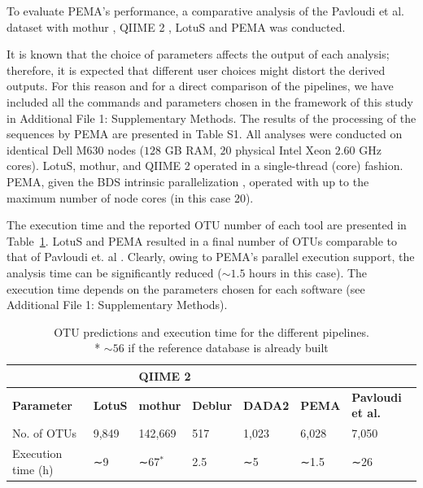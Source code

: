       To evaluate PEMA's performance, a comparative analysis of the Pavloudi et al. \cite{pavloudi2017sediment} dataset with mothur \cite{schloss2009introducing}, QIIME 2 \cite{bolyen2018qiime}, LotuS \cite{hildebrand2014lotus} and PEMA was conducted.

      It is known that the choice of parameters affects the output of each analysis; 
      therefore, it is expected that different user choices might distort the derived outputs. 
      For this reason and for a direct comparison of the pipelines, we have included all the commands and parameters chosen in the framework of this study in Additional File 1: Supplementary Methods. 
      The results of the processing of the sequences by PEMA are presented in Table S1. 
      All analyses were conducted on identical Dell M630 nodes ($128$ GB RAM, $20$ physical Intel Xeon $2.60$ GHz cores). 
      LotuS, mothur, and QIIME 2 operated in a single-thread (core) fashion. 
      PEMA, given the BDS intrinsic parallelization \cite{cingolani2015bigdatascript}, operated with up to the maximum number of node cores (in this case $20$).

      The execution time and the reported OTU number of each tool are presented in Table~\ref{table:pema-compare-times}. 
      LotuS and PEMA resulted in a final number of OTUs comparable to that of Pavloudi et. al \cite{pavloudi2017sediment}. 
      Clearly, owing to PEMA's parallel execution support, the analysis time can be significantly reduced ($∼1.5$ hours in this case). 
      The execution time depends on the parameters chosen for each software (see Additional File 1: Supplementary Methods).

      \begin{table}[]
         \begin{tabular}{@{}lllllll@{}}
         \toprule
         \textbf{} & \textbf{} & \multicolumn{2}{l}{\textbf{QIIME 2}} & \textbf{} & \textbf{} &  \\ \midrule
         \textbf{Parameter} & \textbf{LotuS} & \textbf{mothur} & \textbf{Deblur} & \textbf{DADA2} & \textbf{PEMA} & \textbf{Pavloudi et al. \cite{pavloudi2017sediment}} \\
         No. of OTUs & 9,849 & 142,669 & 517 & 1,023 & 6,028 & 7,050 \\
         Execution time (h) & ∼9 & ∼67$^*$  & 2.5 & ∼5 & ∼1.5 & ∼26 \\ \bottomrule
         \end{tabular}
         \caption[OTU predictions and execution time for the different pipelines]{OTU predictions and execution time for the different pipelines. \\ * $∼56$ if the reference database is already built}
         \label{table:pema-compare-times}
      \end{table}


